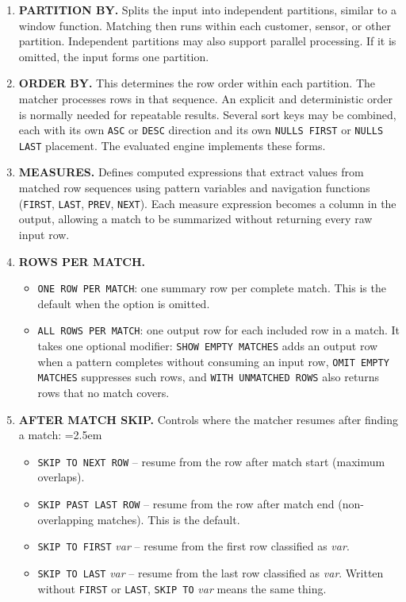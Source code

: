 \begin{enumerate}

\item \textbf{PARTITION BY.}
Splits the input into independent
partitions, similar to a window function.  Matching then runs within
each customer, sensor, or other partition.  Independent partitions may
also support parallel processing.  If it is omitted, the input forms
one partition.

\item \textbf{ORDER BY.}
This determines the row order within each partition.  The matcher
processes rows in that sequence.  An explicit and deterministic order
is normally needed for repeatable results.  Several sort keys may be
combined, each with its own \texttt{ASC} or \texttt{DESC} direction
and its own \texttt{NULLS FIRST} or \texttt{NULLS LAST} placement.
The evaluated engine implements these forms.


\item \textbf{MEASURES.}
  Defines computed expressions that extract values from
  matched row sequences using pattern variables and navigation functions
  (\texttt{FIRST}, \texttt{LAST}, \texttt{PREV}, \texttt{NEXT}).
  Each measure expression becomes a column in the output, allowing a
  match to be summarized without returning every raw input row.

\item \textbf{ROWS PER MATCH.}
  \begin{itemize}
    \item \texttt{ONE ROW PER MATCH}: one summary row per complete
      match.  This is the default when the option is omitted.
    \item \texttt{ALL ROWS PER MATCH}: one output row for each included
      row in a match.  It takes one optional modifier:
      \texttt{SHOW EMPTY MATCHES} adds an output row when a pattern
      completes without consuming an input row,
      \texttt{OMIT EMPTY MATCHES} suppresses such rows, and
      \texttt{WITH UNMATCHED ROWS} also returns rows that no match
      covers.
  \end{itemize}

\item \textbf{AFTER MATCH SKIP.}
  Controls where the matcher resumes after finding a match:
  \begingroup\emergencystretch=2.5em
  \begin{itemize}
    \item \texttt{SKIP TO NEXT ROW} -- resume from the row after
      match start (maximum overlaps).
    \item \texttt{SKIP PAST LAST ROW} -- resume from the row after
      match end (non-overlapping matches).  This is the default.
    \item \texttt{SKIP TO FIRST} \textit{var} -- resume from the
      first row classified as \textit{var}.
    \item \texttt{SKIP TO LAST} \textit{var} -- resume from the last
      row classified as \textit{var}.  Written without
      \texttt{FIRST} or \texttt{LAST}, \texttt{SKIP TO} \textit{var}
      means the same thing.
  \end{itemize}
  \endgroup


\end{enumerate}
